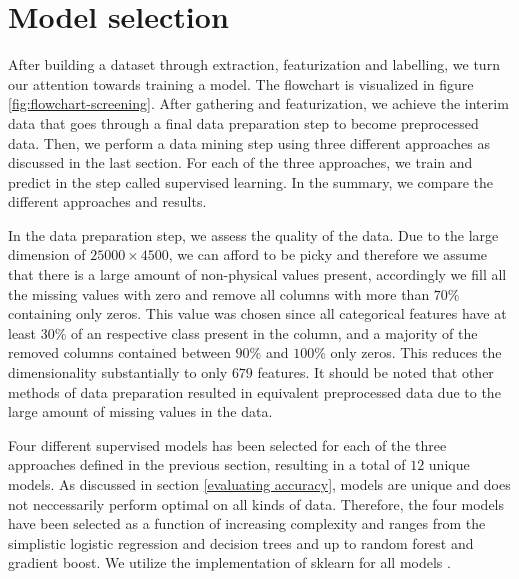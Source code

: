 \begin{comment}
\begin{figure}[t]{1\textwidth}
    \centering
    \texttt{[image: ../predicting-solid-state-qubit-candidates/reports/figures/buildingFeatures/histogram\_oxid\_nelements.pdf]}
    \caption{}
\end{figure}%
\end{comment}

\section{Model selection}

After building a dataset through extraction, featurization and labelling, we turn our attention towards training a model. The flowchart is visualized in figure \ref{fig:flowchart-screening}. After gathering and featurization, we achieve the interim data that goes through a final data preparation step to become preprocessed data. Then, we perform a data mining step using three different approaches as discussed in the last section. For each of the three approaches, we train and predict in the step called supervised learning. In the summary, we compare the different approaches and results.

In the data preparation step, we assess the quality of the data. Due to the large dimension of $25000 \times 4500$, we can afford to be picky and therefore we assume that there is a large amount of non-physical values present, accordingly we fill all the missing values with zero and remove all columns with more than $70\%$ containing only zeros. This value was chosen since all categorical features have at least $30\%$ of an respective class present in the column, and a majority of the removed columns contained between $90\%$ and $100\%$ only zeros. This reduces the dimensionality substantially to only $679$ features. It should be noted that other methods of data preparation resulted in equivalent preprocessed data due to the large amount of missing values in the data.

Four different supervised models has been selected for each of the three approaches defined in the previous section, resulting in a total of $12$ unique models. As discussed in section \ref{evaluating accuracy}, models are unique and does not neccessarily perform optimal on all kinds of data. Therefore, the four models have been selected as a function of increasing complexity and ranges from the simplistic logistic regression and decision trees and up to random forest and gradient boost. We utilize the implementation of sklearn for all models \cite{Pedregosa2012}.

